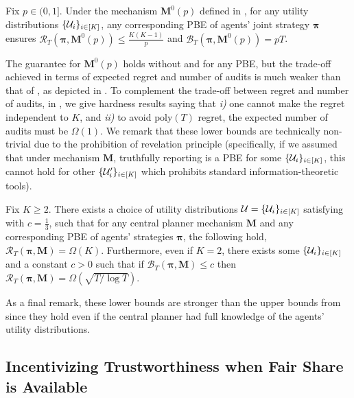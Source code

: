 \begin{theorem}\label{thm:simple mech main theorem}
Fix $p\in(0,1]$. Under the mechanism $\bm M^0(p)$ defined in , for any utility distributions $\{\mathcal{U}_i\}_{i\in[K]}$, any corresponding PBE of agents' joint strategy $\bm \pi$ ensures $\mathcal R_T(\bm \pi,\bm M^0(p))\leq \frac{K(K-1)}{p}$ and $\mathcal B_T(\bm \pi,\bm M^0(p))=pT$.
\end{theorem}

The guarantee for $\bm M^0(p)$ holds without  and for any PBE, but the trade-off achieved in terms of expected regret and number of audits is much weaker than that of \mechname, as depicted in .
To complement the trade-off between regret and number of audits, in , we give hardness results saying that \textit{i)} one cannot make the regret independent to $K$, and \textit{ii)} to avoid $\text{poly}(T)$ regret, the expected number of audits must be $\Omega(1)$. We remark that these lower bounds are technically non-trivial due to the prohibition of revelation principle (specifically, if we assumed that under mechanism $\bm M$, truthfully reporting is a PBE for some $\{\mathcal{U}_i\}_{i\in [K]}$, this cannot hold for other $\{\mathcal{U}_i'\}_{i\in [K]}$ which prohibits standard information-theoretic tools).

\begin{theorem}
\label{thm:lower_bounds}
Fix $K\geq 2$. There exists a choice of utility distributions $\mathcal{U}=\{\mathcal{U}_i\}_{i\in [K]}$ satisfying  with $c=\frac{1}{3}$, such that for any central planner mechanism $\bm M$ and any corresponding PBE of agents' strategies $\bm \pi$, the following hold, $\mathcal R_T(\bm \pi,\bm M) =\Omega(K)$. Furthermore, even if $K=2$, there exists some $\{\mathcal{U}_i\}_{i\in [K]}$ and a constant $c>0$ such that if $\mathcal B_T(\bm \pi,\bm M) \leq c$ then $\mathcal R_T(\bm \pi,\bm M) =\Omega(\sqrt {T/\log T})$.
\end{theorem}
As a final remark, these lower bounds are stronger than the upper bounds from  since they hold even if the central planner had full knowledge of the agents' utility distributions.

\subsection{Incentivizing Trustworthiness when Fair Share is Available}\label{sec:description of check prob}

